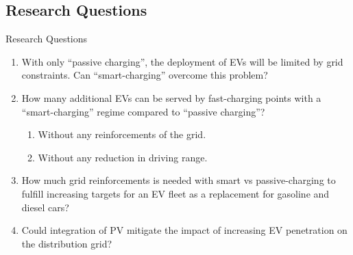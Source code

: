 \documentclass[aspectratio=169]{beamer}
\begin{document}
	\subsection{Research Questions}
		\begin{frame}{Research Questions}
\begin{enumerate}[label=\textbf{RQ {\arabic*}.},ref=RQ {\arabic*}.]
\item<1-> \label{int:RQ1} With only ``passive charging'', the deployment of EVs will be limited by grid constraints. Can ``smart-charging'' overcome this problem?
\item<2-> \label{int:RQ2} How many additional EVs can be served by fast-charging points with a ``smart-charging'' regime compared to ``passive charging''? 
\begin{enumerate}[label=\textbf{C {\arabic*}.},ref=C {\arabic*}.]
\item<3-> \label{int:con1}  Without any reinforcements of the grid. 
\item<4-> \label{int:con2} Without any reduction in driving range.
\end{enumerate}
\item<5-> \label{int:RQ3} How much grid reinforcements is needed with smart vs passive-charging to fulfill increasing targets for an EV fleet as a replacement for gasoline and diesel cars?
\item<6-> \label{int:RQ4} Could integration of PV mitigate the impact of increasing EV penetration on the distribution grid?
\end{enumerate}
\end{frame}	
\end{document}
